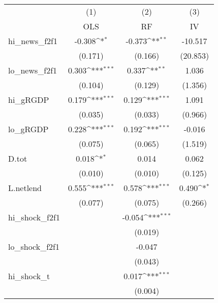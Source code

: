 {
\def\sym#1{\ifmmode^{#1}\else\(^{#1}\)\fi}
\begin{tabular}{l*{3}{c}}
\toprule
            &\multicolumn{1}{c}{(1)}&\multicolumn{1}{c}{(2)}&\multicolumn{1}{c}{(3)}\\
            &\multicolumn{1}{c}{OLS}&\multicolumn{1}{c}{RF}&\multicolumn{1}{c}{IV}\\
\midrule
hi\_news\_f2f1&      -0.308\sym{*}  &      -0.373\sym{**} &     -10.517         \\
            &     (0.171)         &     (0.166)         &    (20.853)         \\
\addlinespace
lo\_news\_f2f1&       0.303\sym{***}&       0.337\sym{**} &       1.036         \\
            &     (0.104)         &     (0.129)         &     (1.356)         \\
\addlinespace
hi\_gRGDP    &       0.179\sym{***}&       0.129\sym{***}&       1.091         \\
            &     (0.035)         &     (0.033)         &     (0.966)         \\
\addlinespace
lo\_gRGDP    &       0.228\sym{***}&       0.192\sym{***}&      -0.016         \\
            &     (0.075)         &     (0.065)         &     (1.519)         \\
\addlinespace
D.tot       &       0.018\sym{*}  &       0.014         &       0.062         \\
            &     (0.010)         &     (0.010)         &     (0.125)         \\
\addlinespace
L.netlend   &       0.555\sym{***}&       0.578\sym{***}&       0.490\sym{*}  \\
            &     (0.077)         &     (0.075)         &     (0.266)         \\
\addlinespace
hi\_shock\_f2f1&                     &      -0.054\sym{***}&                     \\
            &                     &     (0.019)         &                     \\
\addlinespace
lo\_shock\_f2f1&                     &      -0.047         &                     \\
            &                     &     (0.043)         &                     \\
\addlinespace
hi\_shock\_t  &                     &       0.017\sym{***}&                     \\
            &                     &     (0.004)         &                     \\

\end{tabular}}
